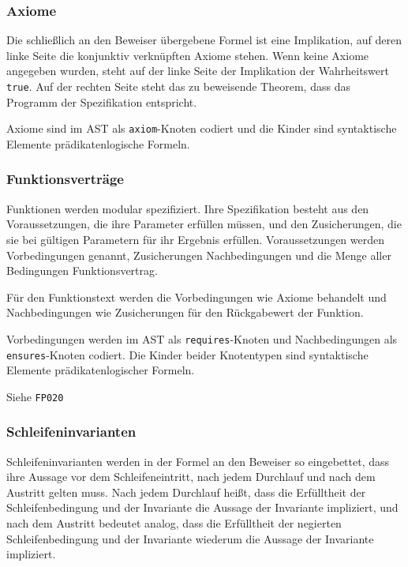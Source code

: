 \subsubsection{Axiome}%

Die schließlich an den Beweiser übergebene Formel ist eine
Implikation, auf deren linke Seite die konjunktiv verknüpften Axiome
stehen. Wenn keine Axiome angegeben wurden, steht auf der linke Seite
der Implikation der Wahrheitswert \texttt{true}. Auf der rechten Seite
steht das zu beweisende Theorem, dass das Programm der Spezifikation
entspricht.%

Axiome sind im AST als \texttt{axiom}-Knoten codiert und die Kinder
sind syntaktische Elemente prädikatenlogische Formeln.%

\subsubsection{Funktionsverträge}%

Funktionen werden modular spezifiziert. Ihre Spezifikation besteht aus
den Voraussetzungen, die ihre Parameter erfüllen müssen, und den
Zusicherungen, die sie bei gültigen Parametern für ihr Ergebnis
erfüllen. Voraussetzungen werden Vorbedingungen genannt, Zusicherungen
Nachbedingungen und die Menge aller Bedingungen Funktionsvertrag.%

Für den Funktionstext werden die Vorbedingungen wie Axiome behandelt
und Nachbedingungen wie Zusicherungen für den Rückgabewert der
Funktion.%

Vorbedingungen werden im AST als \texttt{requires}-Knoten und
Nachbedingungen als \texttt{ensures}-Knoten codiert. Die Kinder beider
Knotentypen sind syntaktische Elemente prädikatenlogischer Formeln.%

Siehe \texttt{FP020}%

\subsubsection{Schleifeninvarianten}%

Schleifeninvarianten werden in der Formel an den Beweiser so
eingebettet, dass ihre Aussage vor dem Schleifeneintritt, nach jedem
Durchlauf und nach dem Austritt gelten muss. Nach jedem Durchlauf
heißt, dass die Erfülltheit der Schleifenbedingung und der Invariante
die Aussage der Invariante impliziert, und nach dem Austritt bedeutet
analog, dass die Erfülltheit der negierten Schleifenbedingung und der
Invariante wiederum die Aussage der Invariante impliziert.%

